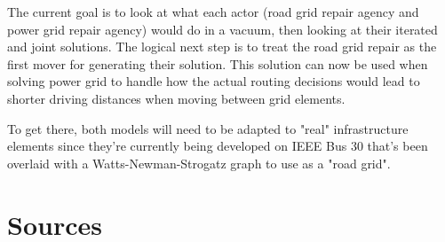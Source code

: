 \documentclass{article}
\begin{document}
	The current goal is to look at what each actor (road grid repair agency and power grid repair agency) would do in a vacuum, then looking at their iterated and joint solutions. The logical next step is to treat the road grid repair as the first mover for generating their solution. This solution can now be used when solving power grid to handle how the actual routing decisions would lead to shorter driving distances when moving between grid elements.
	
	To get there, both models will need to be adapted to "real" infrastructure elements since they're currently being developed on IEEE Bus 30 that's been overlaid with a Watts-Newman-Strogatz graph to use as a "road grid". 
	\section{Sources}
\end{document}
